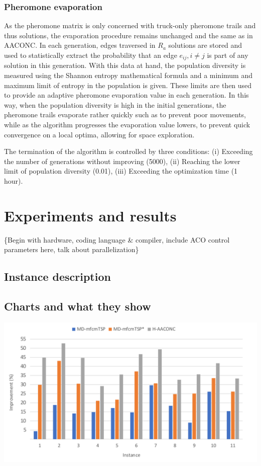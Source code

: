 \documentclass{article}
\begin{document}
	\subsubsection{Pheromone evaporation}
	As the pheromone matrix is only concerned with truck-only pheromone trails and thus solutions, the evaporation procedure remains unchanged and the same as in AACONC. In each generation, edges traversed in $R_a$ solutions are stored and used to statistically extract the probability that an edge $e_{ij},i\neq j$ is part of any solution in this generation. With this data at hand, the population diversity is measured using the Shannon entropy mathematical formula and a minimum and maximum limit of entropy in the population is given. These limits are then used to provide an adaptive pheromone evaporation value in each generation. In this way, when the population diversity is high in the initial generations, the pheromone trails evaporate rather quickly such as to prevent poor movements, while as the algorithm progresses the evaporation value lowers, to prevent quick convergence on a local optima, allowing for space exploration.
	\par 
	The termination of the algorithm is controlled by three conditions: (i) Exceeding the number of generations without improving (5000), (ii) Reaching the lower limit of population diversity (0.01), (iii) Exceeding the optimization time (1 hour).
	\section{Experiments and results}
	\{Begin with hardware, coding language \& compiler, include ACO control parameters here, talk about parallelization\}
	\subsection{Instance description}
	\subsection{Charts and what they show}
	\includegraphics{small_15-20-20}\;
	\clearpage
	\printbibliography
	
\end{document}
